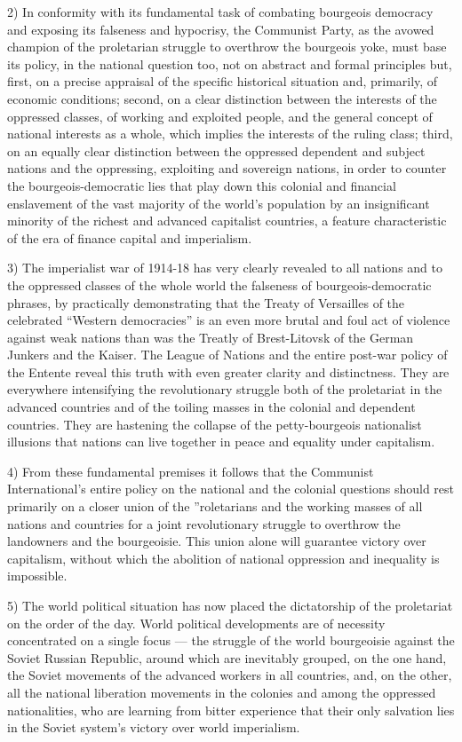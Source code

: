 2) In conformity with its fundamental task of combating bourgeois democracy and exposing its falseness and hypocrisy, the Communist Party, as the avowed champion of the proletarian struggle to overthrow the bourgeois yoke, must base its policy, in the national question too, not on abstract and formal principles but, first, on a precise appraisal of the specific historical situation and, primarily, of economic conditions; second, on a clear distinction between the interests of the oppressed classes, of working and exploited people, and the general concept of national interests as a whole, which implies the interests of the ruling class; third, on an equally clear distinction between the oppressed dependent and subject nations and the oppressing, exploiting and sovereign nations, in order to counter the bourgeois-democratic lies that play down this colonial and financial enslavement of the vast majority of the world’s population by an insignificant minority of the richest and advanced capitalist countries, a feature characteristic of the era of finance capital and imperialism. 

3) The imperialist war of 1914-18 has very clearly revealed to all nations and to the oppressed classes of the whole world the falseness of bourgeois-democratic phrases, by practically demonstrating that the Treaty of Versailles of the celebrated “Western democracies” is an even more brutal and foul act of violence against weak nations than was the Treatly of Brest-Litovsk of the German Junkers and the Kaiser. The League of Nations and the entire post-war policy of the Entente reveal this truth with even greater clarity and distinctness. They are everywhere intensifying the revolutionary struggle both of the proletariat in the advanced countries and of the toiling masses in the colonial and dependent countries. They are hastening the collapse of the petty-bourgeois nationalist illusions that nations can live together in peace and equality under capitalism. 

4) From these fundamental premises it follows that the Communist International’s entire policy on the national and the colonial questions should rest primarily on a closer union of the ''roletarians and the working masses of all nations and countries for a joint revolutionary struggle to overthrow the landowners and the bourgeoisie. This union alone will guarantee victory over capitalism, without which the abolition of national oppression and inequality is impossible. 

5) The world political situation has now placed the dictatorship of the proletariat on the order of the day. World political developments are of necessity concentrated on a single focus — the struggle of the world bourgeoisie against the Soviet Russian Republic, around which are inevitably grouped, on the one hand, the Soviet movements of the advanced workers in all countries, and, on the other, all the national liberation movements in the colonies and among the oppressed nationalities, who are learning from bitter experience that their only salvation lies in the Soviet system’s victory over world imperialism. 

